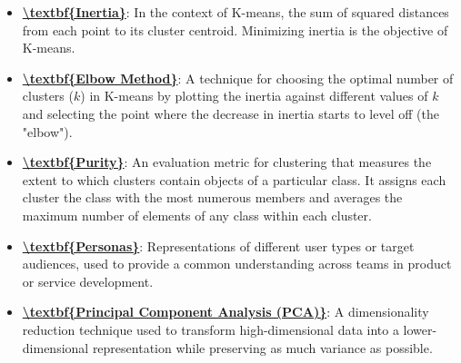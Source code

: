 \documentclass{article}%
\begin{document}
\begin{itemize}[leftmargin=*]
\item \href{https://www.math.purdue.edu/~yipn/351/12L2-distance-clusters.pdf#page=33}{\textbf{\textbackslash{}textbf\{Inertia\}}}: In the context of K-means, the sum of squared distances from each point to its cluster centroid. Minimizing inertia is the objective of K-means.%
\item \href{https://www.math.purdue.edu/~yipn/351/12L2-distance-clusters.pdf#page=33}{\textbf{\textbackslash{}textbf\{Elbow Method\}}}: A technique for choosing the optimal number of clusters ($k$) in K-means by plotting the inertia against different values of $k$ and selecting the point where the decrease in inertia starts to level off (the "elbow").%
\item \href{https://www.math.purdue.edu/~yipn/351/12L2-distance-clusters.pdf#page=44}{\textbf{\textbackslash{}textbf\{Purity\}}}: An evaluation metric for clustering that measures the extent to which clusters contain objects of a particular class. It assigns each cluster the class with the most numerous members and averages the maximum number of elements of any class within each cluster.%
\item \href{https://www.math.purdue.edu/~yipn/351/12L2-distance-clusters.pdf#page=11}{\textbf{\textbackslash{}textbf\{Personas\}}}: Representations of different user types or target audiences, used to provide a common understanding across teams in product or service development.%
\item \href{https://www.math.purdue.edu/~yipn/351/12L2-distance-clusters.pdf#page=41}{\textbf{\textbackslash{}textbf\{Principal Component Analysis (PCA)\}}}: A dimensionality reduction technique used to transform high-dimensional data into a lower-dimensional representation while preserving as much variance as possible.%
\end{itemize}%
\end{document}
